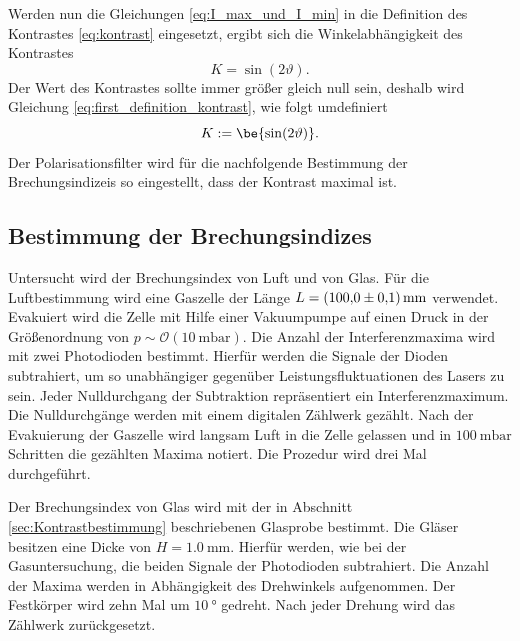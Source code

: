 Werden nun die Gleichungen \eqref{eq:I_max_und_I_min} in die Definition des Kontrastes \eqref{eq:kontrast}
eingesetzt, ergibt sich die Winkelabhängigkeit des Kontrastes
\begin{equation}
  \label{eq:first_definition_kontrast}
  K=\sin(2\vartheta).
\end{equation}
Der Wert des Kontrastes sollte immer größer gleich null sein, deshalb wird Gleichung \eqref{eq:first_definition_kontrast},
wie folgt umdefiniert
\begin{equation}
  \label{eq:definition_dontrast}
  K:=\be{\sin(2\vartheta)}.
\end{equation}
Der Polarisationsfilter wird für die nachfolgende Bestimmung der Brechungsindizeis
so eingestellt, dass der Kontrast maximal ist.
\subsection{Bestimmung der Brechungsindizes}
Untersucht wird der Brechungsindex von Luft und von Glas.
Für die Luftbestimmung wird eine Gaszelle der Länge $L=\SI{100\pm0.1}{\milli\meter}$
verwendet. Evakuiert wird die Zelle mit Hilfe einer Vakuumpumpe auf einen
Druck in der Größenordnung von $p\sim\mathcal{O}(\SI{10}{\milli\bar})$.
Die Anzahl der Interferenzmaxima wird mit zwei Photodioden bestimmt.
Hierfür werden die Signale der Dioden subtrahiert, um so unabhängiger gegenüber
Leistungsfluktuationen des Lasers zu sein. Jeder Nulldurchgang der Subtraktion
repräsentiert ein Interferenzmaximum. Die Nulldurchgänge werden mit einem digitalen
Zählwerk gezählt. Nach der Evakuierung der Gaszelle wird langsam Luft in die Zelle
gelassen und in $\SI{100}{\milli\bar}$ Schritten die gezählten Maxima notiert. Die Prozedur wird
drei Mal durchgeführt.

Der Brechungsindex von Glas wird mit der in Abschnitt \ref{sec:Kontrastbestimmung}
beschriebenen Glasprobe bestimmt. Die Gläser besitzen eine Dicke von $H=\SI{1.0}{\milli\meter}$.
Hierfür werden, wie bei der Gasuntersuchung,
die beiden Signale der Photodioden subtrahiert. Die Anzahl der Maxima
werden in Abhängigkeit des Drehwinkels aufgenommen.
Der Festkörper wird zehn Mal um
$\SI{10}{\degree}$ gedreht. Nach jeder Drehung wird das Zählwerk zurückgesetzt.
